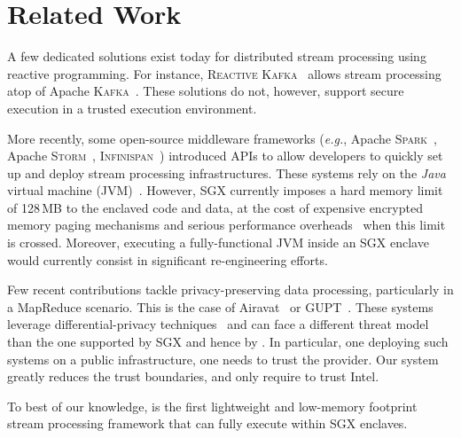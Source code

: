 \section{Related Work}\label{sec:rw}


A few dedicated solutions exist today for distributed stream processing using reactive programming.
For instance, \textsc{Reactive Kafka}~\cite{reactivekafka} allows stream processing atop of Apache \textsc{Kafka}~\cite{apachekafka}.
These solutions do not, however, support secure execution in a trusted execution environment.

More recently, some open-source middleware frameworks (\emph{e.g.}, Apache \textsc{Spark}~\cite{apachesparkstreaming}, Apache \textsc{Storm}~\cite{apachestorm}, \textsc{Infinispan}~\cite{infinispan}) introduced APIs to allow developers to quickly set up and deploy stream processing infrastructures.
These systems rely on the \emph{Java} virtual machine (JVM)~\cite{lindholm2014java}.
However, SGX currently imposes a hard memory limit of 128\,MB to the enclaved code and data, at the cost of expensive encrypted memory paging mechanisms and serious performance overheads~\cite{pires_scbr:2016,brenner_securekeeper:_2016} when this limit is crossed.
Moreover, executing a fully-functional JVM inside an SGX enclave would currently consist in significant re-engineering efforts.

Few recent contributions tackle privacy-preserving data processing, particularly in a MapReduce scenario.
This is the case of Airavat~\cite{Roy:2010:ASP:1855711.1855731} or GUPT~\cite{Mohan:2012:GPP:2213836.2213876}.
These systems leverage differential-privacy techniques~\cite{dwork2006calibrating} and can face a different threat model than the one supported by SGX and hence by \SYS.
In particular, one deploying such systems on a public infrastructure, one needs to trust the provider. 
Our system greatly reduces the trust boundaries, and only require to trust Intel.  

To best of our knowledge, \SYS{} is the first lightweight and low-memory footprint stream processing framework that can fully execute within SGX enclaves.
